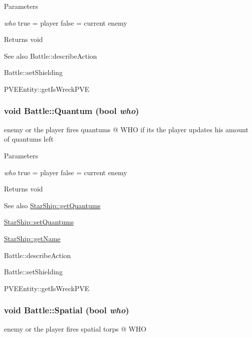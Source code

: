 \begin{DoxyParams}{Parameters}
\item[{\em who}]true = player false = current enemy\end{DoxyParams}
\begin{DoxyReturn}{Returns}
void
\end{DoxyReturn}
\begin{DoxySeeAlso}{See also}
Battle::describeAction 

Battle::setShielding

PVEEntity::getIsWreckPVE 
\end{DoxySeeAlso}
\hypertarget{classBattle_ab146205ff35979b462ee057f3dedf84c}{
\subsubsection[{Quantum}]{\setlength{\rightskip}{0pt plus 5cm}void Battle::Quantum (bool {\em who})}}
\label{dd/dfd/classBattle_ab146205ff35979b462ee057f3dedf84c}
enemy or the player fires quantums @ WHO if its the player updates his amount of quantums left


\begin{DoxyParams}{Parameters}
\item[{\em who}]true = player false = current enemy\end{DoxyParams}
\begin{DoxyReturn}{Returns}
void
\end{DoxyReturn}
\begin{DoxySeeAlso}{See also}
\hyperlink{classStarShip_a5859482046dae7a0ac2ad18c5714f6eb}{StarShip::getQuantums} 

\hyperlink{classStarShip_a54668a25efe99edc19892e3433008843}{StarShip::setQuantums} 

\hyperlink{classStarShip_a822cba8f4276378a9c4cec72213e1e80}{StarShip::getName}

Battle::describeAction 

Battle::setShielding

PVEEntity::getIsWreckPVE 
\end{DoxySeeAlso}
\hypertarget{classBattle_af3866096de0e01ea273b211d0babaade}{
\subsubsection[{Spatial}]{\setlength{\rightskip}{0pt plus 5cm}void Battle::Spatial (bool {\em who})}}
\label{dd/dfd/classBattle_af3866096de0e01ea273b211d0babaade}
enemy or the player fires spatial torps @ WHO


